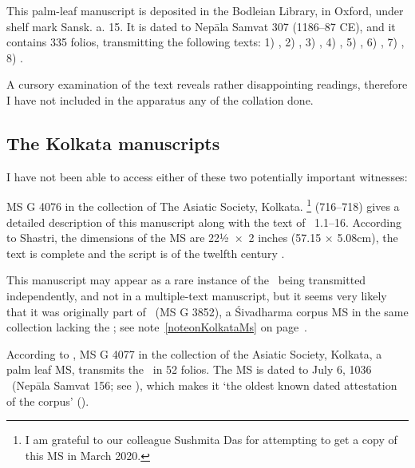 This palm-leaf manuscript is deposited in the Bodleian Library, in Oxford, 
under shelf mark %
Sansk. a. 15. It is dated to Nepāla Samvat 307 (1186--87 CE),
and it contains 335 folios, transmitting the following texts: 
1) , %
2) , %
3) , %
4) , %
5) , %
6) \Uums, %
7) , %
8) . %

A cursory examination of the text reveals rather disappointing 
readings, therefore I have not included  in the apparatus
any of the collation done.

\medskip
\subsection{The Kolkata manuscripts}

I have not been able to access either of these two
potentially important witnesses:

MS G 4076 in the collection of The Asiatic Society, Kolkata.%
	\footnote{I am grateful to our colleague 
				     Sushmita Das for attempting to 
					get a copy of this MS in March 2020.}
 (716--718) gives a 
detailed description of this manuscript along with the text
of \VSS\ 1.1--16. According to Shastri, the dimensions of the MS are
22½~×~2 inches (57.15 × 5.08cm), the text is complete and
the script is of the twelfth century \CE. 

This manuscript may appear as a rare instance of the \VSS\
being transmitted independently, and not in a multiple-text
manuscript, but it seems very likely that it was originally part of
\msKob\ (MS G 3852), a Śivadharma corpus MS  in the same collection lacking the \VSS; see note~\ref{noteonKolkataMs}
on page~\pageref{noteonKolkataMs}.



According to ,
MS G 4077 in the collection of the Asiatic Society, Kolkata,
a palm leaf MS, transmits the \VSS\ in 52 folios.
The MS is dated to July 6, 1036 \CE\ (Nepāla Samvat 156; 
see ), which makes
it `the oldest known dated attestation of the corpus'
().


